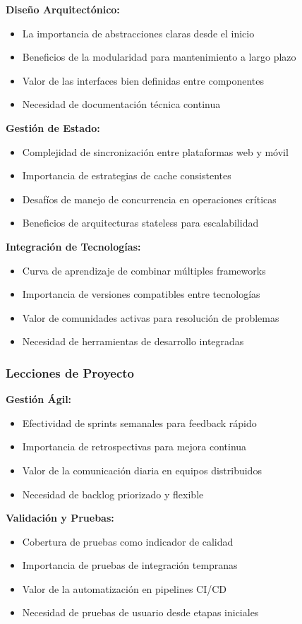 \textbf{Diseño Arquitectónico:}
\begin{itemize}
\item La importancia de abstracciones claras desde el inicio
\item Beneficios de la modularidad para mantenimiento a largo plazo
\item Valor de las interfaces bien definidas entre componentes
\item Necesidad de documentación técnica continua
\end{itemize}

\textbf{Gestión de Estado:}
\begin{itemize}
\item Complejidad de sincronización entre plataformas web y móvil
\item Importancia de estrategias de cache consistentes
\item Desafíos de manejo de concurrencia en operaciones críticas
\item Beneficios de arquitecturas stateless para escalabilidad
\end{itemize}

\textbf{Integración de Tecnologías:}
\begin{itemize}
\item Curva de aprendizaje de combinar múltiples frameworks
\item Importancia de versiones compatibles entre tecnologías
\item Valor de comunidades activas para resolución de problemas
\item Necesidad de herramientas de desarrollo integradas
\end{itemize}

\subsubsection{Lecciones de Proyecto}

\textbf{Gestión Ágil:}
\begin{itemize}
\item Efectividad de sprints semanales para feedback rápido
\item Importancia de retrospectivas para mejora continua
\item Valor de la comunicación diaria en equipos distribuidos
\item Necesidad de backlog priorizado y flexible
\end{itemize}

\textbf{Validación y Pruebas:}
\begin{itemize}
\item Cobertura de pruebas como indicador de calidad
\item Importancia de pruebas de integración tempranas
\item Valor de la automatización en pipelines CI/CD
\item Necesidad de pruebas de usuario desde etapas iniciales
\end{itemize}

